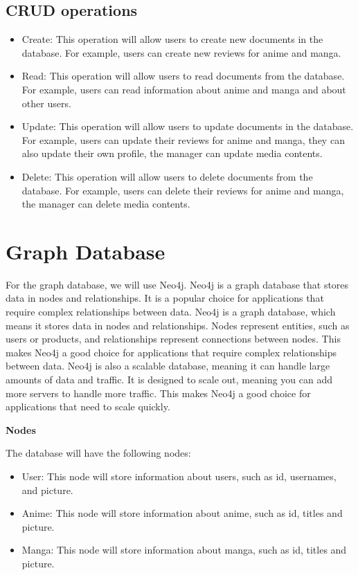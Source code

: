 \subsection {CRUD operations}
\begin{itemize}
    \item Create: This operation will allow users to create new documents in the database. For example, users can create new reviews for anime and manga.
    \item Read: This operation will allow users to read documents from the database. For example, users can read information about anime and manga and about other users.
    \item Update: This operation will allow users to update documents in the database. For example, users can update their reviews for anime and manga, they can also update their own profile, the manager can update media contents.
    \item Delete: This operation will allow users to delete documents from the database. For example, users can delete their reviews for anime and manga, the manager can delete media contents.
\end{itemize}

\newpage
\section{Graph Database}
For the graph database, we will use Neo4j. Neo4j is a graph database that stores data in nodes and relationships. It is a popular choice for applications that require complex relationships between data. Neo4j is a graph database, which means it stores data in nodes and relationships. Nodes represent entities, such as users or products, and relationships represent connections between nodes. This makes Neo4j a good choice for applications that require complex relationships between data. Neo4j is also a scalable database, meaning it can handle large amounts of data and traffic. It is designed to scale out, meaning you can add more servers to handle more traffic. This makes Neo4j a good choice for applications that need to scale quickly.



\textbf{Nodes}



The database will have the following nodes:
\begin{itemize}
    \item User: This node will store information about users, such as id, usernames, and picture.
    \item Anime: This node will store information about anime, such as id, titles and picture.
    \item Manga: This node will store information about manga, such as id, titles and picture.
\end{itemize}


